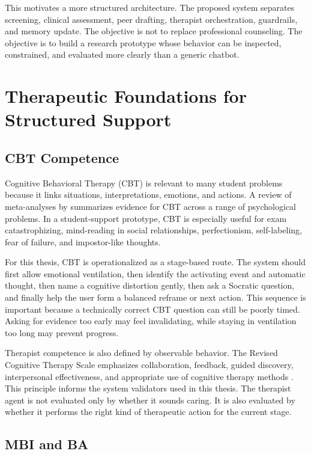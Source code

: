 This motivates a more structured architecture. The proposed system separates screening, clinical assessment, peer drafting, therapist orchestration, guardrails, and memory update. The objective is not to replace professional counseling. The objective is to build a research prototype whose behavior can be inspected, constrained, and evaluated more clearly than a generic chatbot.

\section{Therapeutic Foundations for Structured Support}

\subsection{CBT Competence}

Cognitive Behavioral Therapy (CBT) is relevant to many student problems because it links situations, interpretations, emotions, and actions. A review of meta-analyses by \citet{Hofmann2012CBTMetaAnalyses} summarizes evidence for CBT across a range of psychological problems. In a student-support prototype, CBT is especially useful for exam catastrophizing, mind-reading in social relationships, perfectionism, self-labeling, fear of failure, and impostor-like thoughts.

For this thesis, CBT is operationalized as a stage-based route. The system should first allow emotional ventilation, then identify the activating event and automatic thought, then name a cognitive distortion gently, then ask a Socratic question, and finally help the user form a balanced reframe or next action. This sequence is important because a technically correct CBT question can still be poorly timed. Asking for evidence too early may feel invalidating, while staying in ventilation too long may prevent progress.

Therapist competence is also defined by observable behavior. The Revised Cognitive Therapy Scale emphasizes collaboration, feedback, guided discovery, interpersonal effectiveness, and appropriate use of cognitive therapy methods \citep{Blackburn2001CTSR}. This principle informs the system validators used in this thesis. The therapist agent is not evaluated only by whether it sounds caring. It is also evaluated by whether it performs the right kind of therapeutic action for the current stage.

\subsection{MBI and BA}

